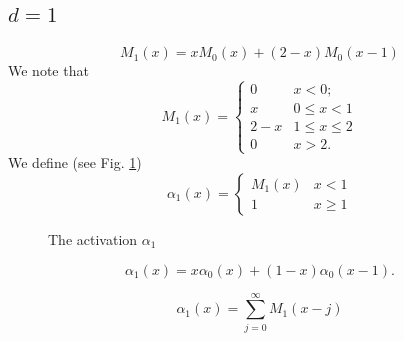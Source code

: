 \subsection{$d=1$}
\begin{equation}
  \label{M1M0}
M_1(x)=xM_0(x)+(2-x)M_0(x-1)  
\end{equation}
We note that
\begin{equation}
  \label{M1}
M_1(x)= 
\left\{
\begin{array}{cl}
0 & x<0; \\
x & 0\le x < 1\\
2-x & 1\le x \le 2\\
0 & x>2.
  \end{array}
\right.
\end{equation}
We define (see Fig. \ref{alpha1})
\begin{equation}
  \label{a1}
\alpha_1(x)= 
\left\{
\begin{array}{cl}
M_1(x) &  x < 1\\
1 & x\ge 1
  \end{array}
\right.
\end{equation}
\begin{figure}[!htb]
	\caption{The activation $\alpha_1$}      
	\label{alpha1}
\end{figure}
 

\begin{lemma}
  \begin{equation}
    \label{a1a0}
\alpha_1(x)=x\alpha_0(x)+(1-x)\alpha_0(x-1).    
  \end{equation}
\end{lemma}

\begin{lemma}
  \begin{equation}
  \label{a1M1}
\alpha_1(x)=\sum_{j=0}^\infty M_1(x-j)    
  \end{equation}
\end{lemma}

